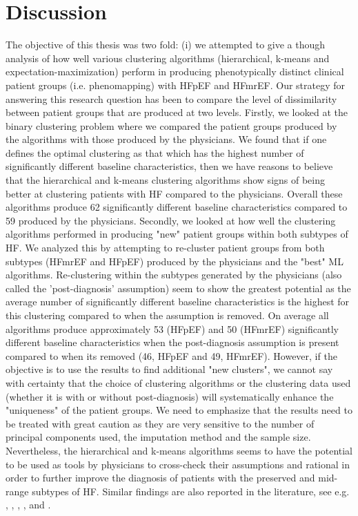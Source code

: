 \documentclass[../thesis.tex]{subfiles}
\begin{document}
\section{Discussion}

\noindent The objective of this thesis was two fold: (i) we attempted to give a though analysis of how well various clustering algorithms (hierarchical, k-means and expectation-maximization) perform in producing phenotypically distinct clinical patient groups (i.e. phenomapping) with HFpEF and HFmrEF. Our strategy for answering this research question has been to compare the level of dissimilarity between patient groups that are produced at two levels. Firstly, we looked at the binary clustering problem where we compared the patient groups produced by the algorithms with those produced by the physicians. We found that if one defines the optimal clustering as that which has the highest number of significantly different baseline characteristics, then we have reasons to believe that the hierarchical and k-means clustering algorithms show signs of being better at clustering patients with HF compared to the physicians. Overall these algorithms produce 62 significantly different baseline characteristics compared to 59 produced by the physicians. Secondly, we looked at how well the clustering algorithms performed in producing "new" patient groups within both subtypes of HF. We analyzed this by attempting to re-cluster patient groups from both subtypes (HFmrEF and HFpEF) produced by the physicians and the "best" ML algorithms. Re-clustering within the subtypes generated by the physicians (also called the 'post-diagnosis' assumption) seem to show the greatest potential as the average number of significantly different baseline characteristics is the highest for this clustering compared to when the assumption is removed. On average all algorithms produce approximately 53 (HFpEF) and 50 (HFmrEF) significantly different baseline characteristics when the post-diagnosis assumption is present compared to when its removed (46, HFpEF and 49, HFmrEF). However, if the objective is to use the results to find additional "new clusters", we cannot say with certainty that the choice of clustering algorithms or the clustering data used (whether it is with or without post-diagnosis) will systematically enhance the "uniqueness" of the patient groups. We need to emphasize that the results need to be treated with great caution as they are very sensitive to the number of principal components used, the imputation method and the sample size. Nevertheless, the hierarchical and k-means algorithms seems to have the potential to be used as tools by physicians to cross-check their assumptions and rational in order to further improve the diagnosis of patients with the preserved and mid-range subtypes of HF. Similar findings are also reported in the literature, see e.g. \cite{shah2014phenomapping}, \cite{ahmad2014clinical}, \cite{alonso2015exploring}, \cite{kao2015characterization}, \cite{ahmad2016clinical} and \cite{katz2017phenomapping}.\\
\end{document}
